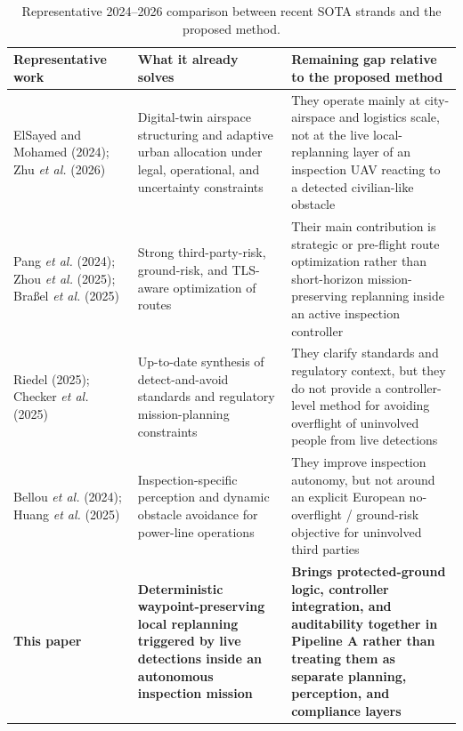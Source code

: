 \documentclass[a4paper,11pt]{article}
\begin{document}
\begin{table}[t]
    \centering
    \caption{Representative 2024--2026 comparison between recent SOTA strands and the proposed method.}
    \label{tab:sota_positioning}
    \footnotesize
    \begin{tabularx}{\linewidth}{@{}Y Y Y@{}}
        \toprule
        \textbf{Representative work} & \textbf{What it already solves} & \textbf{Remaining gap relative to the proposed method} \\
        \midrule
        ElSayed and Mohamed (2024); Zhu \emph{et al.} (2026) \cite{elsayed2024digitaltwin,zhu2026adaptive} & Digital-twin airspace structuring and adaptive urban allocation under legal, operational, and uncertainty constraints & They operate mainly at city-airspace and logistics scale, not at the live local-replanning layer of an inspection UAV reacting to a detected civilian-like obstacle \\
        Pang \emph{et al.} (2024); Zhou \emph{et al.} (2025); Bra{\ss}el \emph{et al.} (2025) \cite{pang2024stochastic,zhou2025riskbased,brassel2025riskaware} & Strong third-party-risk, ground-risk, and TLS-aware optimization of routes & Their main contribution is strategic or pre-flight route optimization rather than short-horizon mission-preserving replanning inside an active inspection controller \\
        Riedel (2025); Checker \emph{et al.} (2025) \cite{riedel2025daa,checker2025regulatory} & Up-to-date synthesis of detect-and-avoid standards and regulatory mission-planning constraints & They clarify standards and regulatory context, but they do not provide a controller-level method for avoiding overflight of uninvolved people from live detections \\
        Bellou \emph{et al.} (2024); Huang \emph{et al.} (2025) \cite{bellou2024aerial,huang2025hybrid} & Inspection-specific perception and dynamic obstacle avoidance for power-line operations & They improve inspection autonomy, but not around an explicit European no-overflight / ground-risk objective for uninvolved third parties \\
        \textbf{This paper} & \textbf{Deterministic waypoint-preserving local replanning triggered by live detections inside an autonomous inspection mission} & \textbf{Brings protected-ground logic, controller integration, and auditability together in Pipeline A rather than treating them as separate planning, perception, and compliance layers} \\
        \bottomrule
    \end{tabularx}
\end{table}
\end{document}
